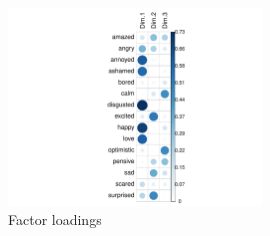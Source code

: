 \documentclass{article} %
\begin{document}
\begin{figure}[H]
    \centering
    \includegraphics[width=0.6\textwidth]{Images/factor_loadings.pdf}
    \caption{Factor loadings}
\end{figure}
\end{document}

